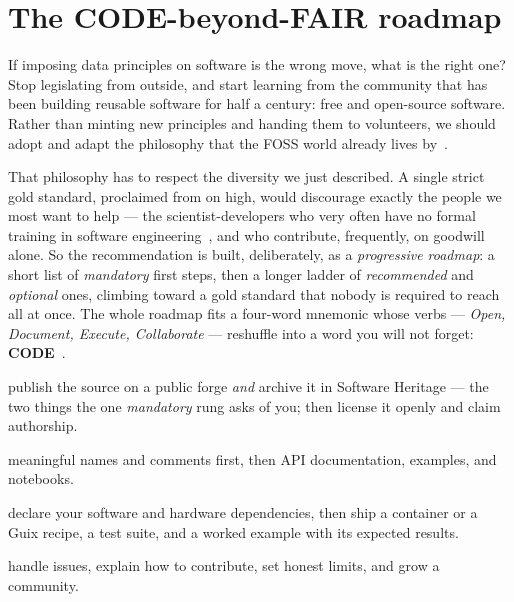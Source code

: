\section{The CODE-beyond-FAIR roadmap}

If imposing data principles on software is the wrong move, what is the right one? Stop legislating
from outside, and start learning from the community that has been building reusable software for
half a century: free and open-source software. Rather than minting new principles and handing them
to volunteers, we should adopt and adapt the philosophy that the FOSS world already lives
by~\autocite{NatureSD2026}.

That philosophy has to respect the diversity we just described. A single strict gold standard,
proclaimed from on high, would discourage exactly the people we most want to help --- the
scientist-developers who very often have no formal training in software
engineering~\autocite{Carver2022}, and who contribute, frequently, on goodwill alone. So the
recommendation is built, deliberately, as a \emph{progressive roadmap}: a short list of
\emph{mandatory} first steps, then a longer ladder of \emph{recommended} and \emph{optional}
ones, climbing toward a gold standard that nobody is required to reach all at once. The whole
roadmap fits a four-word mnemonic whose verbs --- \emph{Open, Document, Execute,
Collaborate} --- reshuffle into a word you will not forget: \textbf{CODE}~\autocite{NatureSD2026}.

\begin{description}[leftmargin=!,labelwidth=2.4cm,font=\bfseries\sffamily]
  \item[Open] publish the source on a public forge \emph{and} archive it in Software Heritage ---
        the two things the one \emph{mandatory} rung asks of you; then license it openly and claim authorship.
  \item[Document] meaningful names and comments first, then API documentation, examples, and
        notebooks.
  \item[Execute] declare your software and hardware dependencies, then ship a container or a Guix
        recipe, a test suite, and a worked example with its expected results.
  \item[Collaborate] handle issues, explain how to contribute, set honest limits, and grow a
        community.
\end{description}

